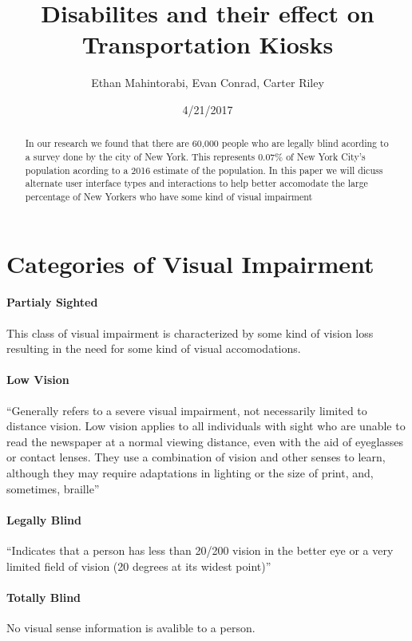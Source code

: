 \documentclass{article}
\author{Ethan Mahintorabi, Evan Conrad, Carter Riley}
\date{4/21/2017}
\title{Disabilites and their effect on Transportation Kiosks}
\begin{document}
    \maketitle

    \begin{abstract}
        In our research we found that there are 60,000 people who are legally
        blind acording to a survey done by the city of New York\cite{BLIND}. This
        represents 0.07\% of New York City's population acording to a 2016 estimate of
        the population\cite{CENCUS_ESTIMATE}. In this paper we will dicuss alternate
        user interface types and interactions to help better accomodate the large percentage
        of New Yorkers who have some kind of visual impairment
    \end{abstract}

    \section{Categories of Visual Impairment}
        \paragraph{Partialy Sighted}
                This class of visual impairment is characterized by some kind of vision
            loss resulting in the need for some kind of visual accomodations.\cite{VISAUL_IMPAIRMENT_DEF}
        \paragraph{Low Vision}
            ``Generally refers to a severe visual impairment,
            not necessarily limited to distance vision. Low vision
            applies to all individuals with sight who are unable
            to read the newspaper at a normal viewing distance,
            even with the aid of eyeglasses or contact lenses. They
            use a combination of vision and other senses to learn,
            although they may require adaptations in lighting or
            the size of print, and, sometimes, braille''\cite{VISAUL_IMPAIRMENT_DEF}
        \paragraph{Legally Blind}
            ``Indicates that a person has less than
            20/200 vision in the better eye or a very limited field of
            vision (20 degrees at its widest point)''\cite{VISAUL_IMPAIRMENT_DEF}
        \paragraph{Totally Blind}
            No visual sense information is avalible to a person.\cite{VISAUL_IMPAIRMENT_DEF}
\end{document}
